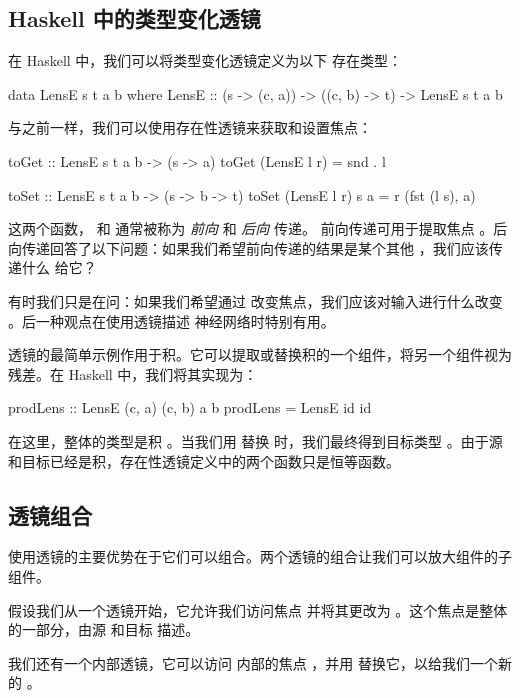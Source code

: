 \documentclass[DaoFP]{subfiles}
\begin{document}
\subsection{Haskell 中的类型变化透镜}
在 Haskell 中，我们可以将类型变化透镜定义为以下 存在类型：
\begin{haskell}
data LensE s t a b where
  LensE :: (s -> (c, a)) -> ((c, b) -> t) -> LensE s t a b
\end{haskell}

与之前一样，我们可以使用存在性透镜来获取和设置焦点：
\begin{haskell}
toGet :: LensE s t a b -> (s -> a)
toGet (LensE l r) = snd . l

toSet :: LensE s t a b -> (s -> b -> t)
toSet (LensE l r) s a = r (fst (l s), a)
\end{haskell}

这两个函数， 和  通常被称为 \emph{前向} 和 \emph{后向} 传递。
前向传递可用于提取焦点 。后向传递回答了以下问题：如果我们希望前向传递的结果是某个其他 ，我们应该传递什么  给它？

有时我们只是在问：如果我们希望通过  改变焦点，我们应该对输入进行什么改变 。后一种观点在使用透镜描述 神经网络时特别有用。

透镜的最简单示例作用于积。它可以提取或替换积的一个组件，将另一个组件视为残差。在 Haskell 中，我们将其实现为：
\begin{haskell}
prodLens :: LensE (c, a) (c, b) a b
prodLens = LensE id id
\end{haskell}
在这里，整体的类型是积 。当我们用  替换  时，我们最终得到目标类型 。由于源和目标已经是积，存在性透镜定义中的两个函数只是恒等函数。

\subsection{透镜组合}

使用透镜的主要优势在于它们可以组合。两个透镜的组合让我们可以放大组件的子组件。

假设我们从一个透镜开始，它允许我们访问焦点  并将其更改为 。这个焦点是整体的一部分，由源  和目标  描述。

我们还有一个内部透镜，它可以访问  内部的焦点 ，并用  替换它，以给我们一个新的 。
\end{document}
